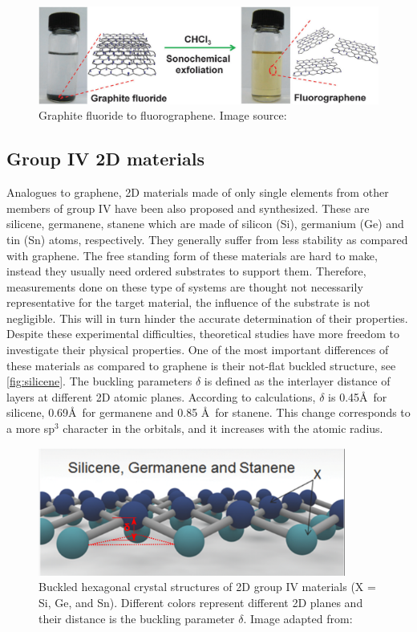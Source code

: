 \begin{figure}[htbp!] 
\centering  
\includegraphics[width=1\textwidth]{fluorographene.png}
\caption{Graphite fluoride to fluorographene. Image source:\cite{Zhu2013}}  
\label{fig:gra_f}
\end{figure} 

\subsection{Group IV 2D materials}

Analogues to graphene, 2D materials made of only single elements from other members of group IV have been also proposed and synthesized. These are silicene, germanene, stanene which are made of silicon (Si), germanium (Ge) and tin (Sn) atoms, respectively. They generally suffer from less stability as compared with graphene. The free standing form of these materials are hard to make, instead they usually need ordered substrates to support them. Therefore, measurements done on these type of systems are thought not necessarily representative for the target material, the influence of the substrate is not negligible\cite{Lin2013}. This will in turn hinder the accurate determination of their properties. Despite these experimental difficulties, theoretical studies have more freedom to investigate their physical properties. One of the most important differences of these materials as compared to graphene is their not-flat buckled structure, see \autoref{fig:silicene}. The buckling parameters $\delta$ is defined as the interlayer distance of layers at different 2D atomic planes. According to calculations, $\delta$ is 0.45\AA~for silicene, 0.69\AA~for germanene and 0.85 \AA~for stanene\cite{matthes2013}. This change corresponds to a more sp$^3$ character in the orbitals, and it increases with the atomic radius. 

\begin{figure}[htbp!] 
\centering  
\includegraphics[width=0.9\textwidth]{silicene_structure.png}
\caption{Buckled hexagonal crystal structures of 2D group IV materials (X = Si, Ge, and Sn). Different colors represent different 2D planes and their distance is the buckling parameter $\delta$. Image adapted from:\cite{Balendhran2015}}  
\label{fig:silicene}
\end{figure} 


